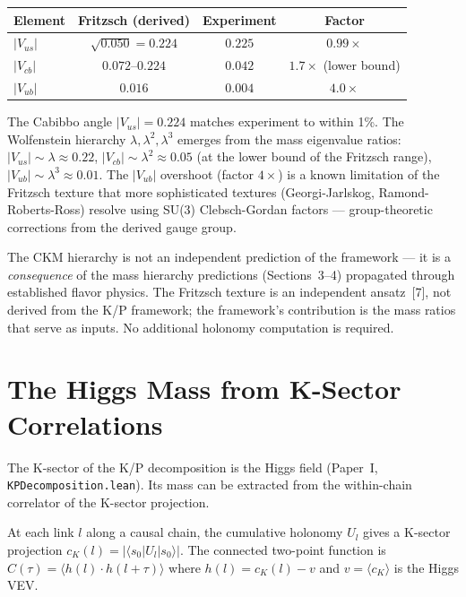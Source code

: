 \documentclass[11pt,letterpaper]{article}
\begin{document}
\begin{center}
\begin{tabular}{@{}lccc@{}}
\toprule
Element & Fritzsch (derived) & Experiment & Factor \\
\midrule
$|V_{us}|$ & $\sqrt{0.050} = 0.224$ & $0.225$ & $0.99\times$ \\
$|V_{cb}|$ & $0.072$--$0.224$ & $0.042$ &
  $1.7\times$ (lower bound) \\
$|V_{ub}|$ & $0.016$ & $0.004$ & $4.0\times$ \\
\bottomrule
\end{tabular}
\end{center}

\noindent The Cabibbo angle $|V_{us}| = 0.224$ matches experiment to
within 1\%.  The Wolfenstein hierarchy $\lambda, \lambda^2, \lambda^3$
emerges from the mass eigenvalue ratios: $|V_{us}| \sim \lambda
\approx 0.22$, $|V_{cb}| \sim \lambda^2 \approx 0.05$ (at the lower
bound of the Fritzsch range), $|V_{ub}| \sim \lambda^3 \approx 0.01$.
The $|V_{ub}|$ overshoot (factor $4\times$) is a known limitation of
the Fritzsch texture that more sophisticated textures
(Georgi-Jarlskog, Ramond-Roberts-Ross) resolve using SU(3)
Clebsch-Gordan factors --- group-theoretic corrections from the
derived gauge group.

The CKM hierarchy is not an independent prediction of the framework
--- it is a \emph{consequence} of the mass hierarchy predictions
(Sections~3--4) propagated through established flavor physics.
The Fritzsch texture is an independent ansatz~[7], not derived
from the K/P framework; the framework's contribution is the mass
ratios that serve as inputs.  No
additional holonomy computation is required.

\section{The Higgs Mass from K-Sector Correlations}

The K-sector of the K/P decomposition is the Higgs field (Paper~I,
\texttt{KPDecomposition.lean}).  Its mass can be extracted from the
within-chain correlator of the K-sector projection.

At each link $l$ along a causal chain, the cumulative holonomy $U_l$
gives a K-sector projection $c_K(l) = |\langle s_0 | U_l | s_0
\rangle|$.  The connected two-point function is $C(\tau) = \langle
h(l) \cdot h(l+\tau)\rangle$ where $h(l) = c_K(l) - v$ and $v =
\langle c_K \rangle$ is the Higgs VEV.
\end{document}
